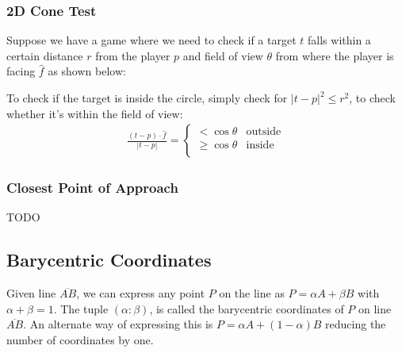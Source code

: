 \documentclass[12pt]{report}
\newcommand\pgfmathsinandcos[3]{%
	  \pgfmathsetmacro#1{sin(#3)}%
	  \pgfmathsetmacro#2{cos(#3)}%
	}
\begin{document}
		\subsubsection{2D Cone Test}
	        	Suppose we have a game where we need to check if a target $t$ falls within a certain distance $r$ from the player $p$ and field of view $\theta$ from where the player is facing $\hat{f}$ as shown below:
	        	\begin{center}
	        	\end{center}
	        	To check if the target is inside the circle, simply check for $|t - p|^2 \leq r^2$, to check whether it's within the field of view:
	        	\begin{align}
	        	\frac{(t - p) \cdot \hat{f}}{|t - p|} = \begin{cases}
	        	< \cos\theta & \text{outside}\\
	        	\geq \cos\theta & \text{inside} \\
	        	\end{cases}
	        	\end{align}
		
		\subsubsection{Closest Point of Approach}
		TODO
	\subsection{Barycentric Coordinates}
		Given line $\overline{AB}$, we can express any point $P$ on the line as $P = \alpha A + \beta B$ with $\alpha + \beta = 1$. The tuple $(\alpha : \beta)$, is called the barycentric coordinates of $P$ on line $\overline{AB}$. An alternate way of expressing this is $P = \alpha A + (1 - \alpha) B$ reducing the number of coordinates by one.
		
\end{document}
